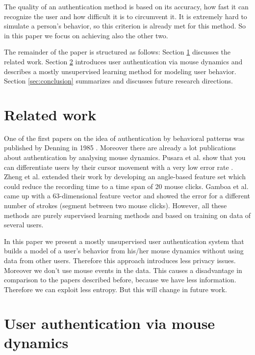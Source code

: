 \documentclass[conference]{IEEEtran}
\begin{document}
The quality of an authentication method is based on its accuracy, how fast it can recognize the user and how difficult it is to circumvent it. It is extremely hard to simulate a person's behavior, so this criterion is already met for this method. So in this paper we focus on achieving also the other two.

The remainder of the paper is structured as follows: Section \ref{sec:relwork} discusses the related work. Section \ref{sec:approach} introduces user
authentication via mouse dynamics and describes a mostly unsupervised learning method for modeling user behavior. Section \ref{sec:conclusion} summarizes and discusses future research directions.


\section{Related work}
\label{sec:relwork}

One of the first papers on the idea of authentication by behavioral patterns was published by Denning in 1985 \cite{denning1985requirements}. Moreover there are already a lot publications about authentication by analysing mouse dynamics. Pusara et al. show that you can differentiate users by their cursor movement with a very low error rate \cite{pusara2004user}. Zheng et al. extended their work by developing an angle-based feature set which could reduce the recording time to a time span of 20 mouse clicks. \cite{zheng2011efficient} Gamboa et al. came up with a 63-dimensional feature vector and showed the error for a different number of strokes (segment between two mouse clicks). \cite{gamboa2003identity} However, all these methods are purely supervised learning methods and based on training on data of several users.

In this paper we present a mostly unsupervised user authentication system that builds a model of a user’s behavior from his/her mouse dynamics without using data from other users. Therefore this approach introduces less privacy issues. Moreover we don't use mouse events in the data. This causes a disadvantage in comparison to the papers described before, because we have less information. Therefore we can exploit less entropy. But this will change in future work.

\section{User authentication via mouse dynamics}
\label{sec:approach}
\end{document}
